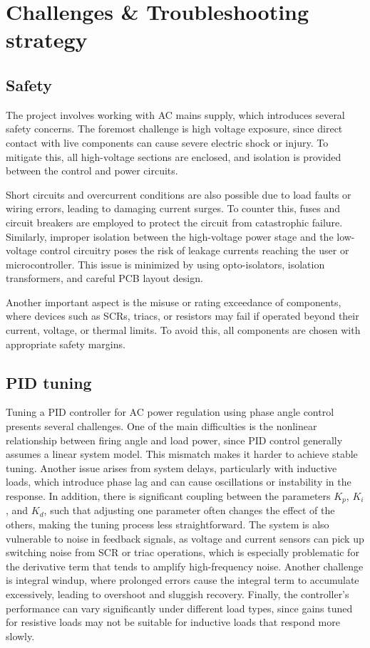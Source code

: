 \documentclass[12pt]{article}
\begin{document}
\section{Challenges \& Troubleshooting strategy}
\subsection{Safety}
The project involves working with AC mains supply, which introduces several safety concerns. The foremost challenge is high voltage exposure, since direct contact with live components can cause severe electric shock or injury. To mitigate this, all high-voltage sections are enclosed, and isolation is provided between the control and power circuits.

Short circuits and overcurrent conditions are also possible due to load faults or wiring errors, leading to damaging current surges. To counter this, fuses and circuit breakers are employed to protect the circuit from catastrophic failure. Similarly, improper isolation between the high-voltage power stage and the low-voltage control circuitry poses the risk of leakage currents reaching the user or microcontroller. This issue is minimized by using opto-isolators, isolation transformers, and careful PCB layout design.

Another important aspect is the misuse or rating exceedance of components, where devices such as SCRs, triacs, or resistors may fail if operated beyond their current, voltage, or thermal limits. To avoid this, all components are chosen with appropriate safety margins.
\subsection{PID tuning}
Tuning a PID controller for AC power regulation using phase angle control presents several challenges. One of the main difficulties is the nonlinear relationship between firing angle and load power, since PID control generally assumes a linear system model. This mismatch makes it harder to achieve stable tuning. Another issue arises from system delays, particularly with inductive loads, which introduce phase lag and can cause oscillations or instability in the response. In addition, there is significant coupling between the parameters $K_p$, $K_i$, and $K_d$, such that adjusting one parameter often changes the effect of the others, making the tuning process less straightforward. The system is also vulnerable to noise in feedback signals, as voltage and current sensors can pick up switching noise from SCR or triac operations, which is especially problematic for the derivative term that tends to amplify high-frequency noise. Another challenge is integral windup, where prolonged errors cause the integral term to accumulate excessively, leading to overshoot and sluggish recovery. Finally, the controller’s performance can vary significantly under different load types, since gains tuned for resistive loads may not be suitable for inductive loads that respond more slowly.
\end{document}
